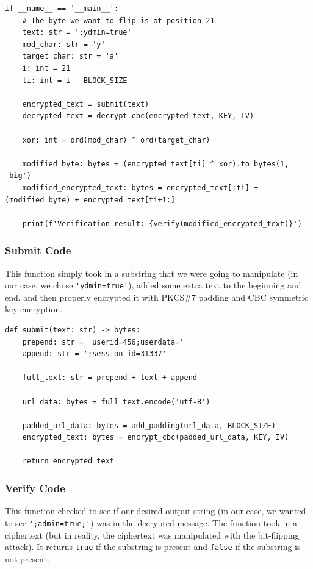 \documentclass[11pt]{article}
\begin{document}
\begin{framed}
\begin{verbatim}
if __name__ == '__main__':
    # The byte we want to flip is at position 21
    text: str = ';ydmin=true'
    mod_char: str = 'y'
    target_char: str = 'a'
    i: int = 21
    ti: int = i - BLOCK_SIZE

    encrypted_text = submit(text)
    decrypted_text = decrypt_cbc(encrypted_text, KEY, IV)

    xor: int = ord(mod_char) ^ ord(target_char)

    modified_byte: bytes = (encrypted_text[ti] ^ xor).to_bytes(1, 'big')
    modified_encrypted_text: bytes = encrypted_text[:ti] + (modified_byte) + encrypted_text[ti+1:]

    print(f'Verification result: {verify(modified_encrypted_text)}')
\end{verbatim}
\end{framed}

\subsubsection*{Submit Code}

This function simply took in a substring that we were going to manipulate (in our case, we chose \verb|'ydmin=true'|), added some extra text to the beginning and end, and then properly encrypted it with PKCS\#7 padding and CBC symmetric key encryption.

\begin{framed}
\begin{verbatim}
def submit(text: str) -> bytes:
    prepend: str = 'userid=456;userdata='
    append: str = ';session-id=31337'

    full_text: str = prepend + text + append 
    
    url_data: bytes = full_text.encode('utf-8')

    padded_url_data: bytes = add_padding(url_data, BLOCK_SIZE)
    encrypted_text: bytes = encrypt_cbc(padded_url_data, KEY, IV)

    return encrypted_text
\end{verbatim}
\end{framed}

\subsubsection*{Verify Code}

This function checked to see if our desired output string (in our case, we wanted to see \verb|';admin=true;'|) was in the decrypted message. The function took in a ciphertext (but in reality, the ciphertext was manipulated with the bit-flipping attack). It returns \verb|true| if the substring is present and \verb|false| if the substring is not present.
\end{document}
